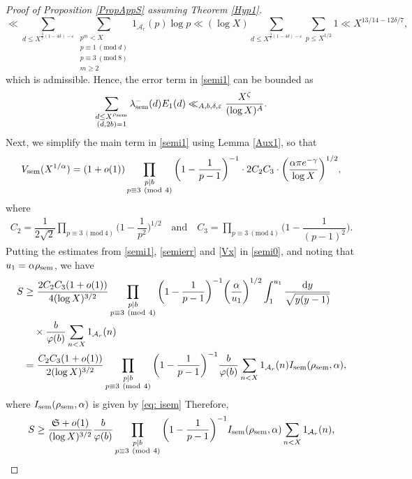 \documentclass[12pt]{amsart}
\numberwithin{equation}{section}
\theoremstyle{remark}
\theoremstyle{definition}
\newcommand{\imod}[1]{\ (\mathrm{mod}\ #1)}
\begin{document}
\begin{proof}[Proof of Proposition \ref{PropAppS} assuming Theorem \ref{Hyp1}]
\[\ll \sum_{d\leq X^{\frac{3}{7}(1-4\delta)-\varepsilon}}\sum_{\substack{p^m<X\\ p\equiv 1\imod d\\ p\equiv 3\imod 8\\ m\geq 2}}1_{\mathcal{A}_r}(p)\log p \ll (\log X)\sum_{d\leq X^{\frac{3}{7}(1-4\delta)-\varepsilon}}\sum_{p\leq X^{1/2}}1 \ll X^{13/14-12\delta/7},\]
which is admissible. Hence, the error term in \eqref{semi1} can be bounded as
\begin{align}\label{semierr}
\sum_{\substack{d\leq X^{\rho_{\textup{sem}}}\\(d, 2b)=1}}\lambda^-_{\textup{sem}}(d){E}_1(d) \ll_{A, b, \delta, \varepsilon} \dfrac{X^{\zeta}}{(\log X)^A}.
\end{align}
Next, we simplify the main term in \eqref{semi1} using Lemma \ref{Aux1}, so that
\begin{align}\label{Vx}
V_{\textup{sem}}(X^{1/\alpha}) = (1+o(1))\prod_{\substack{p|b\\p\equiv 3\imod 4}}\bigg(1-\dfrac{1}{p-1}\bigg)^{-1}\cdot 2C_2C_3\cdot \bigg(\dfrac{\alpha \pi e^{-\gamma}}{\log X}\bigg)^{1/2},
\end{align}
where 
\begin{align}
\label{A} C_2 =\dfrac{1}{2\sqrt{2}}\prod_{p\equiv 3\imod 4}\bigg(1-\dfrac{1}{p^2}\bigg)^{1/2}\quad 
\text{and} \quad C_3 = \prod_{p\equiv 3\imod 4}\bigg(1-\dfrac{1}{(p-1)^2}\bigg).
\end{align}
Putting the estimates from \eqref{semi1}, \eqref{semierr} and \eqref{Vx} in \eqref{semi0}, and noting that $u_1=\alpha\rho_{\textup{sem}}$, we have 
\begin{align}
\notag S \geq &~\dfrac{2C_2C_3(1+o(1))}{4(\log X)^{3/2}} \prod_{\substack{p|b\\p\equiv 3\imod 4}}\bigg(1-\dfrac{1}{p-1}\bigg)^{-1}\bigg(\dfrac{\alpha}{u_1}\bigg)^{1/2} \int_{1}^{u_1}\dfrac{\text{d}y}{\sqrt{y(y-1)}}\\ \notag &\times \dfrac{b}{\varphi(b)}\sum_{n<X}1_{\mathcal{A}_r}(n)\\
\notag = &~\dfrac{C_2C_3(1 + o(1))}{2(\log X)^{3/2}}\prod_{\substack{p|b\\p\equiv 3\imod 4}}\bigg(1-\dfrac{1}{p-1}\bigg)^{-1}\dfrac{b}{\varphi(b)}\sum_{n<X}1_{\mathcal{A}_r}(n)I_{\textup{sem}}(\rho_{\textup{sem}}, \alpha),
\end{align}
where $I_{\textup{sem}}(\rho_{\textup{sem}}, \alpha)$ is given by \eqref{eq: isem} 
Therefore,
\begin{align}
\label{semfin} S\geq \dfrac{\mathfrak{S} + o(1)}{(\log X)^{3/2}}\dfrac{b}{\varphi(b)}\prod_{\substack{p|b\\p\equiv 3\imod 4}}\bigg(1-\dfrac{1}{p-1}\bigg)^{-1}I_{\textup{sem}}(\rho_{\textup{sem}}, \alpha)\sum_{\substack{n<X}}1_{\mathcal{A}_r}(n),

\end{align}
\end{proof}
\end{document}
